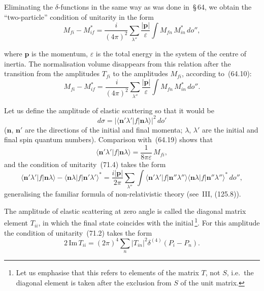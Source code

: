 Eliminating the $\delta$-functions in the same way as was done in~\S\,64, we obtain the ``two-particle'' condition of unitarity in the form
\begin{equation}
M_{fi} - M^*_{if} = \frac{i}{(4\pi)^2}\sum_{\lambda''}\frac{|\mathbf{p}|}{\varepsilon}\int M_{fn}\,M^*_{in}\,do'',
\tag{71.4}
\end{equation}

where $\mathbf{p}$ is the momentum, $\varepsilon$ is the total energy in the system of the centre of inertia. The normalisation volume disappears from this relation after the transition from the amplitudes $T_{fi}$ to the amplitudes $M_{fi}$, according to~(64.10):
\[
M_{fi} - M^*_{if} = \frac{i}{(4\pi)^2}\sum_{\lambda''}\frac{|\mathbf{p}|}{\varepsilon}\int M_{fn}\,M^*_{in}\,do''.
\]

Let us define the amplitude of elastic scattering so that it would be
\begin{equation}
d\sigma = |\langle\mathbf{n}'\lambda'|f|\mathbf{n}\lambda\rangle|^2\,do'
\tag{71.5}
\end{equation}
($\mathbf{n}$, $\mathbf{n}'$ are the directions of the initial and final momenta; $\lambda$, $\lambda'$ are the initial and final spin quantum numbers). Comparison with~(64.19) shows that
\begin{equation}
\langle\mathbf{n}'\lambda'|f|\mathbf{n}\lambda\rangle = \frac{1}{8\pi\varepsilon}\,M_{fi},
\tag{71.6}
\end{equation}
and the condition of unitarity~(71.4) takes the form
\begin{equation}
\langle\mathbf{n}'\lambda'|f|\mathbf{n}\lambda\rangle - \langle\mathbf{n}\lambda|f|\mathbf{n}'\lambda'\rangle^* =
\frac{i|\mathbf{p}|}{2\pi}\sum_{\lambda''}\int\langle\mathbf{n}'\lambda'|f|\mathbf{n}''\lambda''\rangle\langle\mathbf{n}\lambda|f|\mathbf{n}''\lambda''\rangle^*\,do'',
\tag{71.7}
\end{equation}
generalising the familiar formula of non-relativistic theory (see~III, (125.8)).

The amplitude of elastic scattering at zero angle is called the diagonal matrix element $T_{ii}$, in which the final state coincides with the initial\,\footnote{Let us emphasise that this refers to elements of the matrix $T$, not $S$, i.e.\ the diagonal element is taken after the exclusion from $S$ of the unit matrix.}. For this amplitude the condition of unitarity~(71.2) takes the form
\begin{equation}
2\,\mathrm{Im}\,T_{ii} = (2\pi)^4\sum_n|T_{in}|^2\delta^{(4)}(P_i - P_n).
\tag{71.8}
\end{equation}

